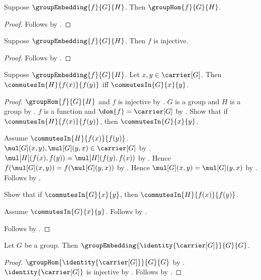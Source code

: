 \begin{proposition}\label{group_embedding_is_hom}
    Suppose $\groupEmbedding{f}{G}{H}$.
    Then $\groupHom{f}{G}{H}$.
\end{proposition}
\begin{proof}
    Follows by .
\end{proof}

\begin{proposition}\label{group_embedding_injective}
    Suppose $\groupEmbedding{f}{G}{H}$.
    Then $f$ is injective.
\end{proposition}
\begin{proof}
    Follows by .
\end{proof}

\begin{theorem}\label{group_embedding_commutes_iff}
    Suppose $\groupEmbedding{f}{G}{H}$.
    Let $x,y\in\carrier[G]$.
    Then $\commutesIn{H}{f(x)}{f(y)}$ iff
        $\commutesIn{G}{x}{y}$.
\end{theorem}
\begin{proof}
    $\groupHom{f}{G}{H}$ and $f$ is injective by
        .
    $G$ is a group and $H$ is a group by
        .
    $f$ is a function and $\dom{f}=\carrier[G]$ by
        .
    Show that if $\commutesIn{H}{f(x)}{f(y)}$, then
        $\commutesIn{G}{x}{y}$.
    \begin{subproof}
        Assume $\commutesIn{H}{f(x)}{f(y)}$.
        $\mul[G](x,y),\mul[G](y,x)\in\carrier[G]$ by
            .
        $\mul[H](f(x),f(y))=\mul[H](f(y),f(x))$ by
            .
        Hence
            $f(\mul[G](x,y))=f(\mul[G](y,x))$ by
            .
        Hence $\mul[G](x,y)=\mul[G](y,x)$ by
            .
        Follows by .
    \end{subproof}
    Show that if $\commutesIn{G}{x}{y}$, then
        $\commutesIn{H}{f(x)}{f(y)}$.
    \begin{subproof}
        Assume $\commutesIn{G}{x}{y}$.
        Follows by .
    \end{subproof}
    Follows by \auto.
\end{proof}

\begin{proposition}\label{identity_group_embedding}
    Let $G$ be a group.
    Then $\groupEmbedding{\identity{\carrier[G]}}{G}{G}$.
\end{proposition}
\begin{proof}
    $\groupHom{\identity{\carrier[G]}}{G}{G}$ by
        .
    $\identity{\carrier[G]}$ is injective by
        .
    Follows by .
\end{proof}

